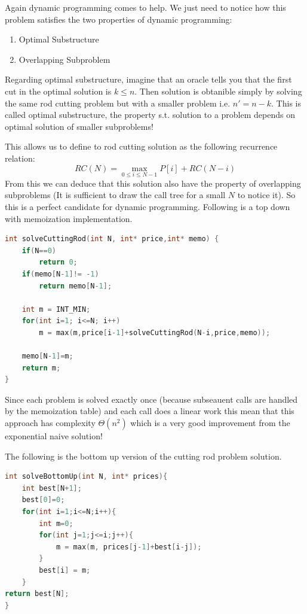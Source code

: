 Again dynamic programming comes to help. We just need to notice how this problem satisfies the two properties of dynamic programming:
\begin{enumerate}
\item Optimal Substructure
\item Overlapping Subproblem
\end{enumerate}
Regarding optimal substructure, imagine that an oracle tells you that the first cut in the optimal solution is $k\leq n$. Then solution is obtanible simply by solving the same rod cutting problem but with a smaller problem i.e. $n' = n-k$. 
This is called optimal substructure, the property s.t. solution to a problem depends on optimal solution of smaller subproblems!

This allows us to define to rod cutting solution as the following recurrence relation:
\[
RC(N) = \max_{0\leq i\leq N-1} P[i] + RC(N-i)
\]
From this we can deduce that this solution also have the property of overlapping subproblems (It is sufficient to draw the call tree for a small $N$ to notice it).
So this is a perfect candidate for dynamic programming.
Following is a top down with memoization implementation.
\begin{lstlisting}[language=c++, caption="Binary knapsack problem -Memoized solution",label=list:knapqudratic]
int solveCuttingRod(int N, int* price,int* memo) {
    if(N==0)
        return 0;
    if(memo[N-1]!= -1)
        return memo[N-1];

    int m = INT_MIN;
    for(int i=1; i<=N; i++)
        m = max(m,price[i-1]+solveCuttingRod(N-i,price,memo));

    memo[N-1]=m;
    return m;
}

	\end{lstlisting}
Since each problem is solved exactly once (because subseauent calls are handled by the memoization table) and each call does a linear work this mean that this approach has complexity $\Theta(n^2)$ which is a very good improvement from the exponential naive solution!

The following is the bottom up version of the cutting rod problem solution.
\begin{lstlisting}[language=c++, caption="Binary knapsack problem -Memoized solution",label=list:knapqudratic]
int solveBottomUp(int N, int* prices){
    int best[N+1];
    best[0]=0;
    for(int i=1;i<=N;i++){
        int m=0;
        for(int j=1;j<=i;j++){
            m = max(m, prices[j-1]+best[i-j]);
        }
        best[i] = m;
    }
return best[N];
}
	\end{lstlisting}

